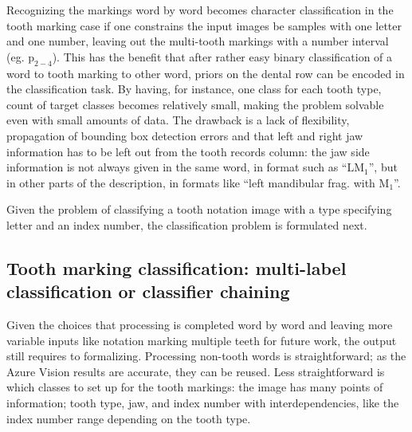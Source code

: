 \documentclass[english,twoside,openright]{UH_DS_MSc}
\begin{document}
Recognizing the markings word by word becomes character classification in 
the tooth marking case if one constrains the input images be samples with one letter and 
one number, leaving out the multi-tooth markings with a number interval (eg. $\text{p}_{2-4}$).
This has the benefit that after rather easy binary classification of a word to 
tooth marking to other word, priors on the dental row can be encoded in the classification
task. By having, for instance, one class for each tooth type, count of target classes becomes
relatively small, making the problem solvable even with small amounts of data.
The drawback is a lack of flexibility, propagation of 
bounding box detection errors and that left and right jaw information has to be left out from 
the tooth records column: the jaw side information is not always given in the same word, 
in format such as ``$\text{LM}_1$'', but in other parts of the description, in formats like
 ``left mandibular frag. with $\text{M}_1$''.

Given the problem of classifying a tooth notation image with a type specifying letter and an index 
number, the classification problem is formulated next.

\subsection{Tooth marking classification: multi-label classification or classifier chaining}

Given the choices that processing is completed word by word and leaving more variable inputs like 
notation marking multiple teeth for future work, the output still requires to formalizing.
Processing non-tooth words is straightforward; as the Azure Vision results are accurate, they
can be reused. Less straightforward is which classes to set up for the 
tooth markings: the image has many points of information; tooth type, jaw, and index number with 
interdependencies, like the index number range depending on the tooth type.
\end{document}
